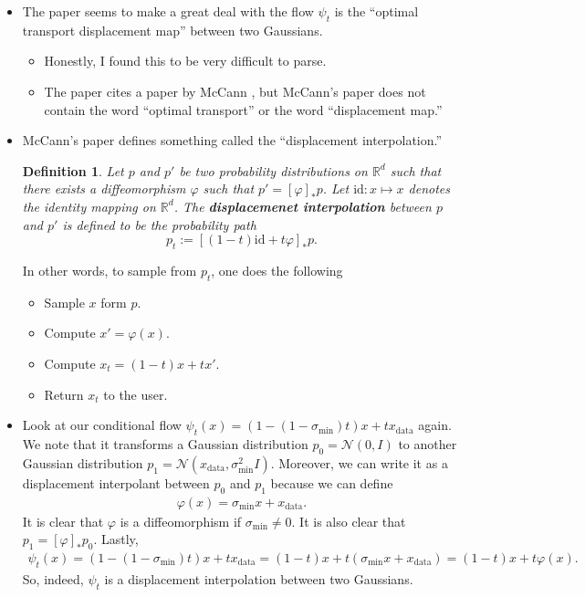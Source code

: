 \documentclass[10pt]{article}
\newtheorem{definition}[lemma]{Definition}
\newcommand{\mrm}[1]{\mathrm{#1}}
\newcommand{\mcal}[1]{\mathcal{#1}}
\newcommand{\Real}{\mathbb{R}}
\newcommand{\data}{\mathrm{data}}
\begin{document}
\begin{itemize}
  \item The paper seems to make a great deal with the flow $\psi_t$ is the ``optimal transport displacement map'' between two Gaussians.
  \begin{itemize}
    \item Honestly, I found this to be very difficult to parse.
    \item The paper cites a paper by McCann \cite{McCann:1997}, but McCann's paper does not contain the word ``optimal transport'' or the word ``displacement map.''
  \end{itemize}

  \item McCann's paper defines something called the ``displacement interpolation.''
  \begin{definition}
    Let $p$ and $p'$ be two probability distributions on $\Real^d$ such that there exists a diffeomorphism $\varphi$ such that $p' = [\varphi]_* p$. Let $\mrm{id}: x \mapsto x$ denotes the identity mapping on $\Real^d$. The {\bf displacemenet interpolation} between $p$ and $p'$ is defined to be the probability path
    $$ p_t := [(1-t)\mrm{id} + t\varphi]_* p.$$
  \end{definition}
  In other words, to sample from $p_t$, one does the following
  \begin{itemize}
    \item Sample $x$ form $p$.
    \item Compute $x' = \varphi(x)$.
    \item Compute $x_t = (1-t) x + tx'$.
    \item Return $x_t$ to the user.
  \end{itemize}

  \item Look at our conditional flow $\psi_t(x) = (1-(1-\sigma_{\min})t) x + tx_{\data}$ again. We note that it transforms a Gaussian distribution $p_0 = \mcal{N}(0,I)$ to another Gaussian distribution $p_1 = \mcal{N}(x_{\data},\sigma_{\min}^2 I)$. Moreover, we can write it as a displacement interpolant between $p_0$ and $p_1$ because we can define
  \begin{align*}
    \varphi(x) = \sigma_{\min} x + x_{\data}.
  \end{align*}
  It is clear that $\varphi$ is a diffeomorphism if $\sigma_{\min} \neq 0$. It is also clear that $p_1 = [\varphi]_* p_0$. Lastly,
  \begin{align*}
    \psi_t(x) = (1 - (1-\sigma_{\min})t) x + tx_{\data} = (1 - t)x + t(\sigma_{\min}x + x_{\data}) = (1-t)x + t\varphi(x).
  \end{align*}
  So, indeed, $\psi_t$ is a displacement interpolation between two Gaussians.


\end{itemize}
\end{document}
